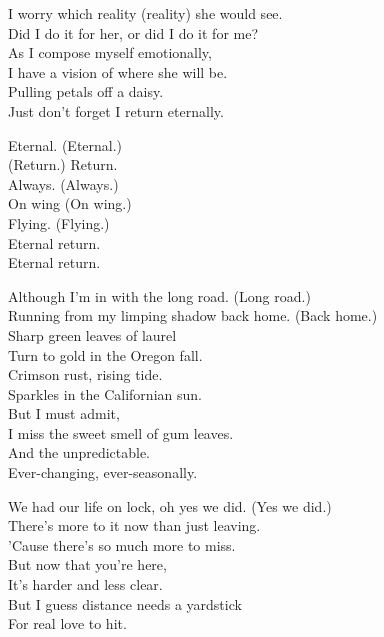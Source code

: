 I worry which reality (reality) she would see. \\
Did I do it for her, or did I do it for me? \\
As I compose myself emotionally, \\
I have a vision of where she will be. \\
Pulling petals off a daisy. \\
Just don't forget I return eternally. \\


Eternal. (Eternal.) \\
(Return.) Return. \\
Always. (Always.) \\
On wing (On wing.) \\
Flying. (Flying.) \\
Eternal return. \\
Eternal return. \\


Although I'm in  with the long road. (Long road.) \\
Running from my limping shadow back home. (Back home.) \\
Sharp green leaves of laurel \\
Turn to gold in the Oregon fall. \\
Crimson rust, rising tide. \\
Sparkles in the Californian sun. \\
But I must admit, \\
I miss the sweet smell of gum leaves. \\
And the unpredictable. \\
Ever-changing, ever-seasonally. \\


We had our life on lock, oh yes we did. (Yes we did.) \\
There's more to it now than just leaving. \\
'Cause there's so much more to miss. \\
But now that you're here, \\
It's harder and less clear. \\
But I guess distance needs a yardstick \\
For real love to hit. \\

